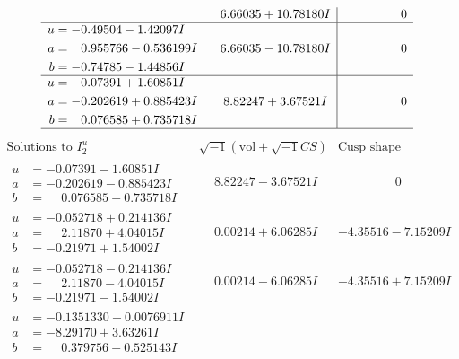 \documentclass[1p]{elsarticle_modified}
\theoremstyle{definition}
\newcommand{\I}{\sqrt{-1}}
\begin{document}
$$\begin{array}{c|c|c}
 & \phantom{-}6.66035 + 10.78180 I & \phantom{-0.000000 } 0 \\ \hline\begin{aligned}
u &= -0.49504 - 1.42097 I \\
a &= \phantom{-}0.955766 - 0.536199 I \\
b &= -0.74785 - 1.44856 I\end{aligned}
 & \phantom{-}6.66035 - 10.78180 I & \phantom{-0.000000 } 0 \\ \hline\begin{aligned}
u &= -0.07391 + 1.60851 I \\
a &= -0.202619 + 0.885423 I \\
b &= \phantom{-}0.076585 + 0.735718 I\end{aligned}
 & \phantom{-}8.82247 + 3.67521 I & \phantom{-0.000000 } 0\\
 \hline 
 \end{array}$$\newpage$$\begin{array}{c|c|c}  
\text{Solutions to }I^u_{2}& \I (\text{vol} + \sqrt{-1}CS) & \text{Cusp shape}\\
 \hline 
\begin{aligned}
u &= -0.07391 - 1.60851 I \\
a &= -0.202619 - 0.885423 I \\
b &= \phantom{-}0.076585 - 0.735718 I\end{aligned}
 & \phantom{-}8.82247 - 3.67521 I & \phantom{-0.000000 } 0 \\ \hline\begin{aligned}
u &= -0.052718 + 0.214136 I \\
a &= \phantom{-}2.11870 + 4.04015 I \\
b &= -0.21971 + 1.54002 I\end{aligned}
 & \phantom{-}0.00214 + 6.06285 I & -4.35516 - 7.15209 I \\ \hline\begin{aligned}
u &= -0.052718 - 0.214136 I \\
a &= \phantom{-}2.11870 - 4.04015 I \\
b &= -0.21971 - 1.54002 I\end{aligned}
 & \phantom{-}0.00214 - 6.06285 I & -4.35516 + 7.15209 I \\ \hline\begin{aligned}
u &= -0.1351330 + 0.0076911 I \\
a &= -8.29170 + 3.63261 I \\
b &= \phantom{-}0.379756 - 0.525143 I\end{aligned}

\end{array}$$
\end{document}
